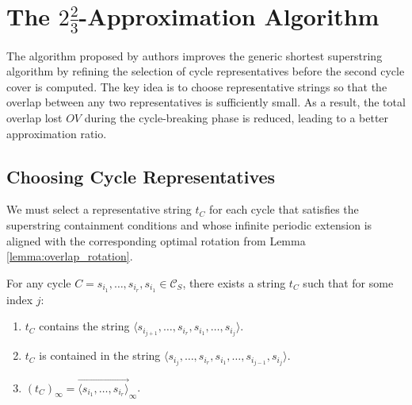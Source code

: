 \section{The $2\frac{2}{3}$-Approximation Algorithm}

The algorithm proposed by authors improves the generic shortest superstring
algorithm by refining the selection of cycle representatives before the second
cycle cover is computed. The key idea is to choose representative strings so
that the overlap between any two representatives is sufficiently small. As a
result, the total overlap lost $OV$ during the cycle-breaking phase is reduced,
leading to a better approximation ratio.

\subsection{Choosing Cycle Representatives}
We must select a representative string $t_C$ for each cycle that satisfies the
superstring containment conditions and whose infinite periodic extension is
aligned with the corresponding optimal rotation from Lemma
\ref{lemma:overlap_rotation}.

\begin{lemma} \label{lemma:representative_choice}
For any cycle $C = s_{i_1}, \dots, s_{i_r}, s_{i_1} \in \mathcal{C}_S$, there
exists a string $t_C$ such that for some index $j$:
\begin{enumerate}
    \item $t_C$ contains the string $\langle s_{i_{j+1}}, \dots, s_{i_r},
    s_{i_1}, \dots, s_{i_j} \rangle$.
    \item $t_C$ is contained in the string $\langle s_{i_j}, \dots, s_{i_r},
    s_{i_1}, \dots, s_{i_{j-1}}, s_{i_j} \rangle$.
    \item $(t_C)_\infty = \overrightarrow{\langle s_{i_1}, \dots, s_{i_r}
    \rangle}_\infty$.
\end{enumerate}
\end{lemma}

